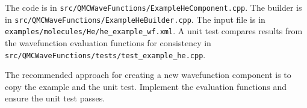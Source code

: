 The code is in \texttt{src/QMCWaveFunctions/ExampleHeComponent.cpp}.
The builder is in \texttt{src/QMCWaveFunctions/ExampleHeBuilder.cpp}.
The input file is in \texttt{examples/molecules/He/he\_example\_wf.xml}.
A unit test compares results from the wavefunction evaluation functions for
consistency in \texttt{src/QMCWaveFunctions/tests/test\_example\_he.cpp}.

The recommended approach for creating a new wavefunction component is to copy the example and the unit test.
Implement the evaluation functions and ensure the unit test passes.
